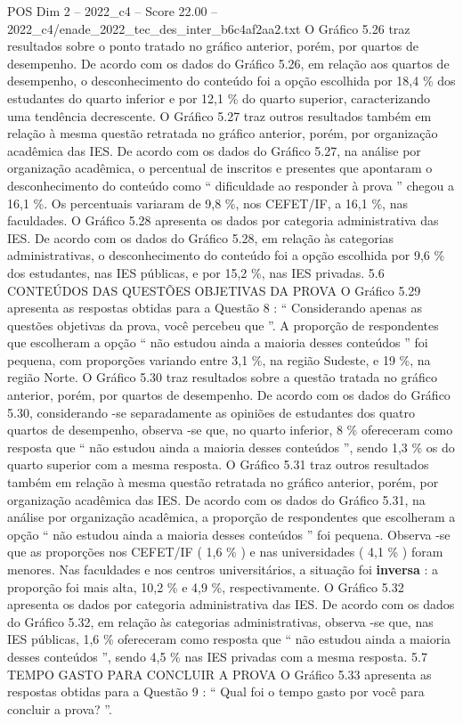 \begin{textsample}{POS Dim 2 – 2022\_c4 – Score 22.00 – 2022\_c4/enade\_2022\_tec\_des\_inter\_b6c4af2aa2.txt}
O Gráfico 5.26 traz resultados sobre o ponto tratado no gráfico anterior, porém, por quartos de desempenho.
De acordo com os dados do Gráfico 5.26, em relação aos quartos de desempenho, o desconhecimento do conteúdo foi a opção escolhida por 18,4 \% dos estudantes do quarto inferior e por 12,1 \% do quarto superior, caracterizando uma tendência decrescente.
O Gráfico 5.27 traz outros resultados também em relação à mesma questão retratada no gráfico anterior, porém, por organização acadêmica das IES.
De acordo com os dados do Gráfico 5.27, na análise por organização acadêmica, o percentual de inscritos e presentes que apontaram o desconhecimento do conteúdo como “ dificuldade ao responder à prova ” chegou a 16,1 \%.
Os percentuais variaram de 9,8 \%, nos CEFET/IF, a 16,1 \%, nas faculdades.
O Gráfico 5.28 apresenta os dados por categoria administrativa das IES.
De acordo com os dados do Gráfico 5.28, em relação às categorias administrativas, o desconhecimento do conteúdo foi a opção escolhida por 9,6 \% dos estudantes, nas IES públicas, e por 15,2 \%, nas IES privadas. 5.6 CONTEÚDOS DAS QUESTÕES OBJETIVAS DA PROVA O Gráfico 5.29 apresenta as respostas obtidas para a Questão 8 : “ Considerando apenas as questões objetivas da prova, você percebeu que ”.
A proporção de respondentes que escolheram a opção “ não estudou ainda a maioria desses conteúdos ” foi pequena, com proporções variando entre 3,1 \%, na região Sudeste, e 19 \%, na região Norte.
O Gráfico 5.30 traz resultados sobre a questão tratada no gráfico anterior, porém, por quartos de desempenho.
De acordo com os dados do Gráfico 5.30, considerando -se separadamente as opiniões de estudantes dos quatro quartos de desempenho, observa -se que, no quarto inferior, 8 \% ofereceram como resposta que “ não estudou ainda a maioria desses conteúdos ”, sendo 1,3 \% os do quarto superior com a mesma resposta.
O Gráfico 5.31 traz outros resultados também em relação à mesma questão retratada no gráfico anterior, porém, por organização acadêmica das IES.
De acordo com os dados do Gráfico 5.31, na análise por organização acadêmica, a proporção de respondentes que escolheram a opção “ não estudou ainda a maioria desses conteúdos ” foi pequena.
Observa -se que as proporções nos CEFET/IF ( 1,6 \% ) e nas universidades ( 4,1 \% ) foram menores.
Nas faculdades e nos centros universitários, a situação foi \textbf{inversa} : a proporção foi mais alta, 10,2 \% e 4,9 \%, respectivamente.
O Gráfico 5.32 apresenta os dados por categoria administrativa das IES.
De acordo com os dados do Gráfico 5.32, em relação às categorias administrativas, observa -se que, nas IES públicas, 1,6 \% ofereceram como resposta que “ não estudou ainda a maioria desses conteúdos ”, sendo 4,5 \% nas IES privadas com a mesma resposta. 5.7 TEMPO GASTO PARA CONCLUIR A PROVA O Gráfico 5.33 apresenta as respostas obtidas para a Questão 9 : “ Qual foi o tempo gasto por você para concluir a prova? ”.

\end{textsample}
